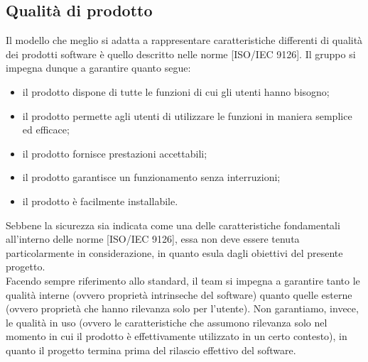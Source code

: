 	\subsection{Qualità di prodotto}
		Il modello che meglio si adatta a rappresentare caratteristiche differenti di qualità dei prodotti software è quello descritto nelle norme 
		[ISO/IEC 9126]. Il gruppo \groupname{} si impegna dunque a garantire quanto segue:
		\begin{itemize}
			\item il prodotto dispone di tutte le funzioni di cui gli utenti hanno bisogno;
			\item il prodotto permette agli utenti di utilizzare le funzioni in maniera semplice ed efficace;
			\item il prodotto fornisce prestazioni accettabili;
			\item il prodotto garantisce un funzionamento senza interruzioni;
			\item il prodotto è facilmente installabile.
		\end{itemize}
		Sebbene la sicurezza sia indicata come una delle caratteristiche fondamentali all'interno delle norme [ISO/IEC 9126], essa non deve essere tenuta 
		particolarmente in considerazione, in quanto esula dagli obiettivi del presente progetto.\\
		Facendo sempre riferimento allo standard, il team si impegna a garantire tanto le qualità interne (ovvero proprietà intrinseche del software) 
		quanto quelle esterne (ovvero proprietà che hanno rilevanza solo per l'utente). Non garantiamo, invece, le qualità in uso (ovvero le 
		caratteristiche che assumono rilevanza solo nel momento in cui il prodotto è effettivamente utilizzato in un certo contesto), in quanto il 
		progetto termina prima del rilascio effettivo del software.
